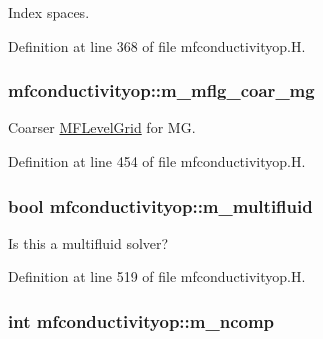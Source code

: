 Index spaces. 



Definition at line 368 of file mfconductivityop.\+H.

\subsubsection[{\texorpdfstring{m\+\_\+mflg\+\_\+coar\+\_\+mg}{m_mflg_coar_mg}}]{ mfconductivityop\+::m\+\_\+mflg\+\_\+coar\+\_\+mg\hspace{0.3cm}{\ttfamily [protected]}}\hypertarget{classmfconductivityop_a71bca3ce242732d534ce68d377633f25}{}\label{classmfconductivityop_a71bca3ce242732d534ce68d377633f25}


Coarser \hyperlink{classMFLevelGrid}{M\+F\+Level\+Grid} for MG. 



Definition at line 454 of file mfconductivityop.\+H.

\subsubsection[{\texorpdfstring{m\+\_\+multifluid}{m_multifluid}}]{\setlength{\rightskip}{0pt plus 5cm}bool mfconductivityop\+::m\+\_\+multifluid\hspace{0.3cm}{\ttfamily [protected]}}\hypertarget{classmfconductivityop_af0fe229ba8e1d994e2a0675e11a03f67}{}\label{classmfconductivityop_af0fe229ba8e1d994e2a0675e11a03f67}


Is this a multifluid solver? 



Definition at line 519 of file mfconductivityop.\+H.

\subsubsection[{\texorpdfstring{m\+\_\+ncomp}{m_ncomp}}]{\setlength{\rightskip}{0pt plus 5cm}int mfconductivityop\+::m\+\_\+ncomp\hspace{0.3cm}{\ttfamily [protected]}}\hypertarget{classmfconductivityop_a494378c20603e8b8cbdb6f411d89d83a}{}\label{classmfconductivityop_a494378c20603e8b8cbdb6f411d89d83a}


